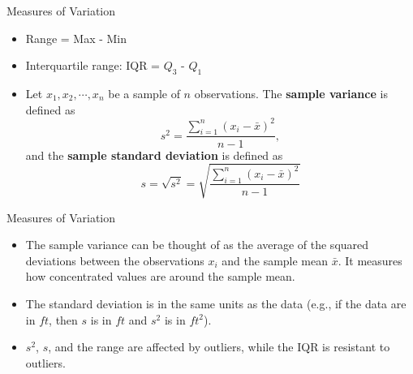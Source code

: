 \documentclass{beamer}
\begin{document}

\begin{frame}{Measures of Variation}
\begin{itemize}
\item Range = Max - Min
\vspace{10pt}
\item Interquartile range: IQR = $Q_3$ - $Q_1$
\vspace{10pt}
\item Let $x_1, x_2, \cdots, x_n$ be a sample of $n$ observations.  The \textbf{sample variance} is defined as
$$s^2 = \frac{\sum_{i=1}^n (x_i - \bar{x})^2}{n-1},$$
and the \textbf{sample standard deviation} is defined as
$$s = \sqrt{s^2} = \sqrt{\frac{\sum_{i=1}^n (x_i - \bar{x})^2}{n-1}}$$
\end{itemize}
\end{frame}

\begin{frame}{Measures of Variation}
\begin{itemize}
\item The sample variance can be thought of as the average of the squared deviations between the observations $x_i$ and the sample mean $\bar{x}$.  It measures how concentrated values are around the sample mean.
\vspace{5pt}
\item The standard deviation is in the same units as the data (e.g., if the data are in $ft$, then $s$ is in $ft$ and $s^2$ is in $ft^2$).
\vspace{5pt}
\item $s^2$, $s$, and the range are affected by outliers, while the IQR is resistant to outliers.
\end{itemize}
\end{frame}
\end{document}

